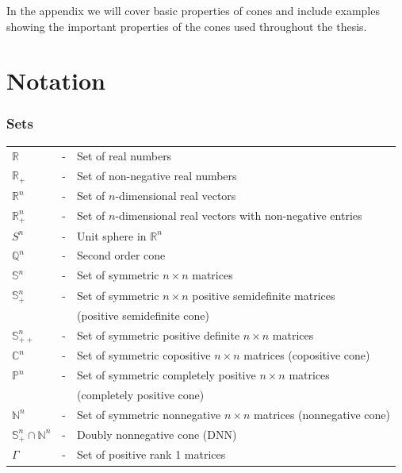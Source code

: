 \documentclass[12pt]{book}
\theoremstyle{definition}
\begin{document}
In the appendix we will cover basic properties of cones and include examples showing the important properties of the cones used throughout the thesis. 




\newpage
\section*{Notation}


\subsubsection{Sets}
\begin{tabular}{lcl}
$\mathbb{R}$ &-& Set of real numbers \\
$\mathbb{R}_+$ &-& Set of non-negative real numbers \\
$\mathbb{R}^n$ &-& Set of $n$-dimensional real vectors   \\
$\mathbb{R}^n_{+}$ &-&  Set of $n$-dimensional real vectors with non-negative entries  \\

$S^n$ &-& Unit sphere in $\mathbb{R}^n$ \\

$\mathbb{Q}^n$ &-& Second order cone \\

$\mathbb{S}^n$ &-& Set of symmetric $n\times n$ matrices \\
$\mathbb{S}^n_+$ &-& Set of symmetric $n\times n$ positive semidefinite  matrices \\& & (positive semidefinite cone) \\
$\mathbb{S}^n_{++}$ &-& Set of symmetric positive definite $n\times n$ matrices \\

$\mathbb{C}^n$ &-& Set of symmetric copositive $n\times n$ matrices (copositive cone) \\
$\mathbb{P}^n$ &-& Set of symmetric completely positive $n\times n$ matrices \\& & (completely positive cone)\\
$\mathbb{N}^n$ &-& Set of symmetric nonnegative $n\times n$ matrices (nonnegative cone) \\
$\mathbb{S}^n_+ \cap \mathbb{N}^n$ &-& Doubly nonnegative cone (DNN) \\
$\Gamma $ &-& Set of positive rank 1 matrices\\
\end{tabular}
\end{document}
